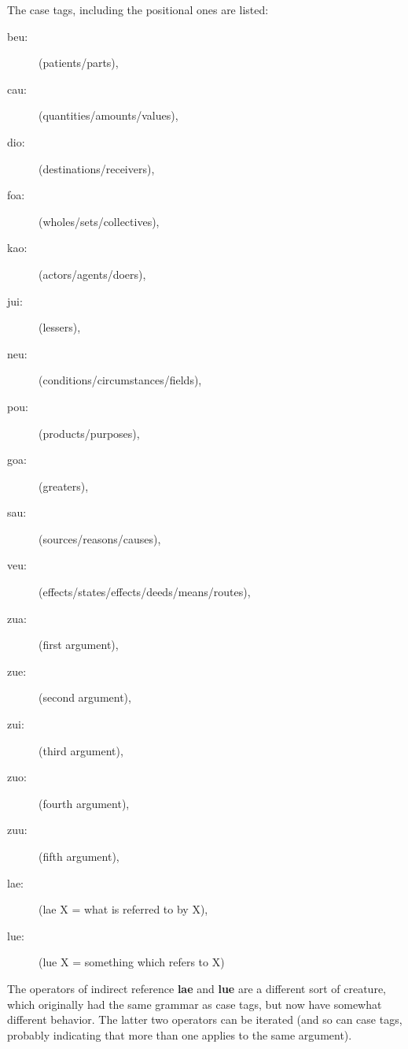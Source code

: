 \documentclass[12pt]{book}
\begin{document}
{The case tags, including the positional ones are listed:  

\begin{description}

\item[beu:] (patients/parts), 

\item[cau:] (quantities/amounts/values), 

\item[dio:] (destinations/receivers), 

\item[foa:] (wholes/sets/collectives), 

\item[kao:] (actors/agents/doers), 

\item[jui:] (lessers),

\item[neu:] (conditions/circumstances/fields), 

\item[pou:] (products/purposes), 

\item[goa:] (greaters), 

\item[sau:] (sources/reasons/causes), 

\item[veu:] (effects/states/effects/deeds/means/routes), 

\item[zua:] (first argument), 

\item[zue:] (second argument), 

\item[zui:] (third argument), 

\item[zuo:] (fourth argument), 

\item[zuu:] (fifth argument), 

\item[lae:] (lae X = what is referred to by X), 

\item[lue:] (lue X = something which refers to X)

\end{description}  The operators of indirect reference {\bf lae} and {\bf lue} are a different sort of creature, which originally had the same grammar as case tags, but now have somewhat different behavior.   The latter two operators can be iterated (and so can case tags, probably indicating that more than one applies to the same argument).

}
\end{document}
